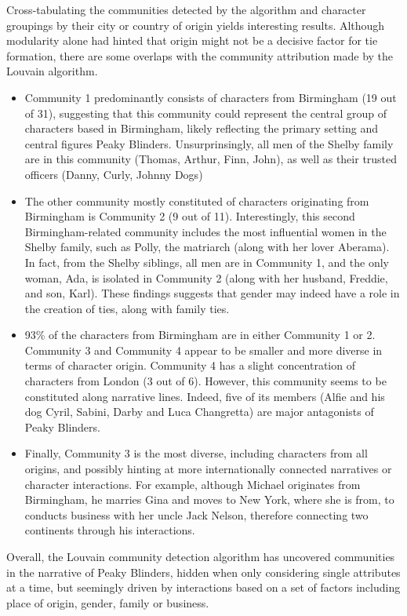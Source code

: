 \documentclass[
]{article}
\begin{document}
Cross-tabulating the communities detected by the algorithm and character
groupings by their city or country of origin yields interesting results.
Although modularity alone had hinted that origin might not be a decisive
factor for tie formation, there are some overlaps with the community
attribution made by the Louvain algorithm.

\begin{itemize}
\item
  Community 1 predominantly consists of characters from Birmingham (19
  out of 31), suggesting that this community could represent the central
  group of characters based in Birmingham, likely reflecting the primary
  setting and central figures Peaky Blinders. Unsurprinsingly, all men
  of the Shelby family are in this community (Thomas, Arthur, Finn,
  John), as well as their trusted officers (Danny, Curly, Johnny Dogs)
\item
  The other community mostly constituted of characters originating from
  Birmingham is Community 2 (9 out of 11). Interestingly, this second
  Birmingham-related community includes the most influential women in
  the Shelby family, such as Polly, the matriarch (along with her lover
  Aberama). In fact, from the Shelby siblings, all men are in Community
  1, and the only woman, Ada, is isolated in Community 2 (along with her
  husband, Freddie, and son, Karl). These findings suggests that gender
  may indeed have a role in the creation of ties, along with family
  ties.
\item
  93\% of the characters from Birmingham are in either Community 1 or 2.
  Community 3 and Community 4 appear to be smaller and more diverse in
  terms of character origin. Community 4 has a slight concentration of
  characters from London (3 out of 6). However, this community seems to
  be constituted along narrative lines. Indeed, five of its members
  (Alfie and his dog Cyril, Sabini, Darby and Luca Changretta) are major
  antagonists of Peaky Blinders.
\item
  Finally, Community 3 is the most diverse, including characters from
  all origins, and possibly hinting at more internationally connected
  narratives or character interactions. For example, although Michael
  originates from Birmingham, he marries Gina and moves to New York,
  where she is from, to conducts business with her uncle Jack Nelson,
  therefore connecting two continents through his interactions.
\end{itemize}

Overall, the Louvain community detection algorithm has uncovered
communities in the narrative of Peaky Blinders, hidden when only
considering single attributes at a time, but seemingly driven by
interactions based on a set of factors including place of origin,
gender, family or business.
\end{document}
